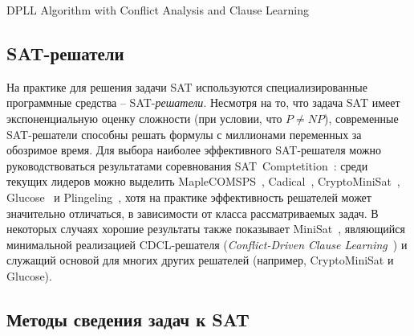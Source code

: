 
\begin{algorithm}[H]
    \caption{DPLL Algorithm with Conflict Analysis and Clause Learning}
    \DontPrintSemicolon


\end{algorithm}

\subsection{SAT-решатели}
\label{sub:sat-solvers}

На практике для решения задачи SAT используются специализированные программные средства \--- SAT-\emph{решатели}.
Несмотря на то, что задача SAT имеет экспоненциальную оценку сложности (при условии, что $P \neq NP$), современные SAT-решатели способны решать формулы с миллионами переменных за обозримое время.
Для выбора наиболее эффективного SAT-решателя можно руководствоваться результатами соревнования SAT~Comptetition~\cite{sat-competition}: среди текущих лидеров можно выделить MapleCOMSPS~\cite{liang-2016}, Cadical~\cite{cadical}, CryptoMiniSat~\cite{cryptominisat}, Glucose~\cite{glucose} и Plingeling~\cite{lingeling-and-friends}, хотя на практике эффективность решателей может значительно отличаться, в зависимости от класса рассматриваемых задач.
В некоторых случаях хорошие результаты также показывает MiniSat~\cite{minisat}, являющийся минимальной реализацией CDCL-решателя (\textit{Conflict-Driven Clause Learning}~\cite{grasp}) и служащий основой для многих других решателей (например, CryptoMiniSat и Glucose).


\subsection{Методы сведения задач к SAT}
\label{sub:sat-encodings}

